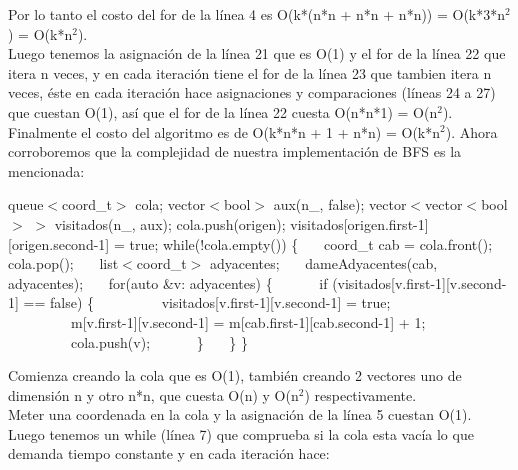 Por lo tanto el costo del for de la línea 4 es O(k*(n*n + n*n + n*n)) = O(k*3*n$^{2}$) = O(k*n$^{2}$). \\

Luego tenemos la asignación de la línea 21 que es O(1) y el for de la línea 22 que itera n veces, y en cada iteración tiene el for de la línea 23 que tambien itera n veces, éste en cada iteración hace asignaciones y comparaciones (líneas 24 a 27) que cuestan O(1), así que el for de la línea 22 cuesta O(n*n*1) = O(n$^{2}$).\\

Finalmente el costo del algoritmo es de O(k*n*n + 1 + n*n) = O(k*n$^{2}$).
Ahora corroboremos que la complejidad de nuestra implementación de BFS es la mencionada:



\begin{codebox}
\li		queue$<$coord\_t$>$ cola;								
\li		vector$<$bool$>$ aux(n\_, false);						
\li		vector$<$vector$<$bool $>$ $>$ visitados(n\_, aux);		
\li		cola.push(origen);										
\li		visitados[origen.first-1][origen.second-1] = true;		
\li		
\li		while(!cola.empty()) \{									
\li \ \ \	coord\_t cab = cola.front(); cola.pop();			
\li \ \ \	list$<$coord\_t$>$ adyacentes;						
\li \ \ \	dameAdyacentes(cab, adyacentes);					
\li		
\li \ \ \	for(auto \&v: adyacentes) \{						
\li	\ \ \ \ \ \		if (visitados[v.first-1][v.second-1] == false) \{	
\li	\ \ \ \ \ \ \ \ \	visitados[v.first-1][v.second-1] = true; 
\li	\ \ \ \ \ \ \ \ \	m[v.first-1][v.second-1] = m[cab.first-1][cab.second-1] + 1;	
\li	\ \ \ \ \ \ \ \ \	cola.push(v);							
\li	\ \ \ \ \ \		\}
\li \ \ \		\}
\li			\}
\end{codebox}

Comienza creando la cola que es O(1), también creando 2 vectores uno de dimensión n y otro n*n, que cuesta O(n) y O(n$^{2}$) respectivamente.\\

Meter una coordenada en la cola y la asignación de la línea 5 cuestan O(1).\\

Luego tenemos un while (línea 7) que comprueba si la cola esta vacía lo que demanda tiempo constante y en cada iteración hace: 

